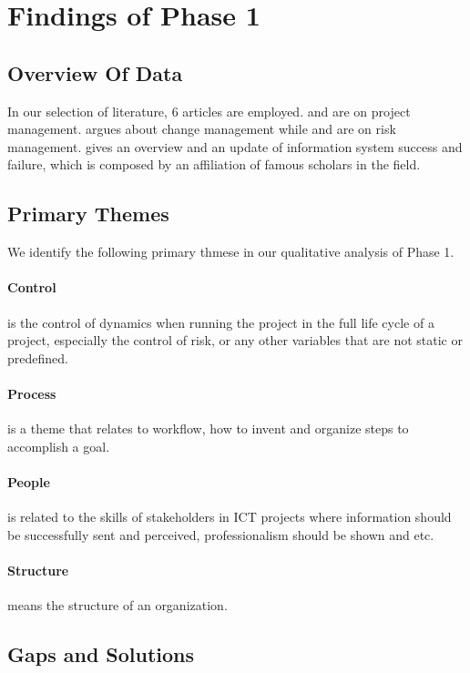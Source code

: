 
\section{Findings of Phase 1}

\subsection{Overview Of Data}
In our selection of literature, 6 articles are employed.  and  are on project management.  argues about change management while  and  are on risk management.  gives an overview and an update of information system success and failure, which is composed by an affiliation of famous scholars in the field.

\subsection{Primary Themes} 
We identify the following primary thmese in our qualitative analysis of Phase 1.

\paragraph{Control} is the control of dynamics when running the project in the full life cycle of a project, especially the control of risk, or any other variables that are not static or predefined.

\paragraph{Process} is a theme that relates to workflow, how to invent and organize steps to accomplish a goal.

\paragraph{People} is related to the skills of stakeholders in ICT projects where information should be successfully sent and perceived, professionalism should be shown and etc.

\paragraph{Structure} means the structure of an organization.

\subsection{Gaps and Solutions}

